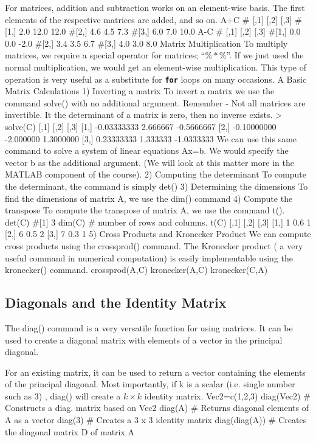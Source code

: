 \documentclass[12pt]{article}
\begin{document}
For matrices, addition and subtraction works on an element-wise basis. 
The first elements of the respective matrices are added, and so on.
A+C # [,1] [,2] [,3] #[1,] 2.0 12.0 12.0 #[2,] 4.6 4.5 7.3 #[3,] 6.0 7.0 10.0 A-C # [,1] [,2] [,3] #[1,] 0.0 0.0 -2.0 #[2,] 3.4 3.5 6.7 #[3,] 4.0 3.0 8.0
Matrix Multiplication To multiply matrices, we require a special operator for matrices; “$\%*\%$”. 
If we just used the normal multiplication, we would get an element-wise multiplication.
This type of operation is very useful as a substitute for \textbf{\texttt{for}} loops on many occasions. A %
Basic Matrix Calculations 1) Inverting a matrix To invert a matrix we use the command solve() with no additional argument. Remember - Not all matrices are invertible. It the determinant of a matrix is zero, then no inverse exists.
> solve(C) [,1] [,2] [,3] [1,] -0.03333333 2.666667 -0.5666667 [2,] -0.10000000 -2.000000 1.3000000 [3,] 0.23333333 1.333333 -1.0333333
We can use this same command to solve a system of linear equations Ax=b. We would specify the vector b as the additional argument. (We will look at this matter more in the MATLAB component of the course).
2) Computing the determinant To compute the determinant, the command is simply det() 3) Determining the dimensions To find the dimensions of matrix A, we use the dim() command
4) Compute the transpose To compute the transpose of matrix A, we use the command t(). det(C) #[1] 3 dim(C) # number of rows and columns. t(C) [,1] [,2] [,3] [1,] 1 0.6 1 [2,] 6 0.5 2 [3,] 7 0.3 1
5) Cross Products and Kronecker Product We can compute cross products using the crossprod() command. The Kronecker product ( a very useful command in numerical computation) is easily implementable using the kronecker() command. crossprod(A,C) kronecker(A,C) kronecker(C,A)
\subsection{Diagonals and the Identity Matrix}
The diag() command is a very versatile function for using matrices. It can be used to create a diagonal matrix with elements of a vector in the principal diagonal. 

For an existing matrix, it can be used to return a vector containing the elements of the principal diagonal. Most importantly, if k is a scalar (i.e. single number such as 3) , diag() will create a $k \times k$ identity matrix.
Vec2=c(1,2,3) diag(Vec2) # Constructs a diag. matrix based on Vec2 diag(A) 
# Returns diagonal elements of A as a vector diag(3) 
# Creates a 3 x 3 identity matrix diag(diag(A)) 
# Creates the diagonal matrix D of matrix A
\end{document}
